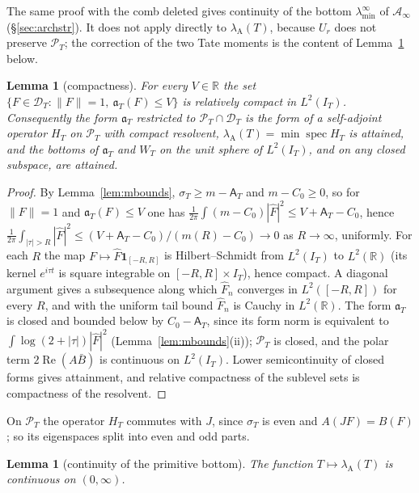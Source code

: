 \documentclass[11pt]{amsart}
\newtheorem{lemma}[theorem]{Lemma}
\theoremstyle{definition}
\theoremstyle{remark}
\newcommand{\R}{\mathbb R}
\newcommand{\Rel}{\operatorname{Re}}
\newcommand{\PT}{\mathcal P_T}
\newcommand{\IT}{I_T}
\newcommand{\lamA}{\lambda_{\mathrm A}(T)}
\newcommand{\sT}{\sigma_T}
\newcommand{\Fh}{\widehat F}
\newcommand{\Aconst}{\mathsf A_T}
\newcommand{\Ainf}{\mathcal A_\infty}
\newcommand{\laminf}{\lambda^{\infty}_{\min}}
\begin{document}
The same proof with the comb deleted gives continuity of the bottom $\laminf$ of $\Ainf$
(\S\ref{sec:archstr}). It does not apply directly to $\lamA$, because $U_r$ does not preserve $\PT$;
the correction of the two Tate moments is the content of Lemma~\ref{lem:contA} below.

\begin{lemma}[compactness]\label{lem:compact}
For every $V\in\R$ the set $\{F\in\mathcal D_T:\|F\|=1,\ \mathfrak a_T(F)\le V\}$ is relatively compact in
$L^2(\IT)$. Consequently the form $\mathfrak a_T$ restricted to $\PT\cap\mathcal D_T$ is the form of a
self-adjoint operator $H_T$ on $\PT$ with compact resolvent, $\lamA=\min\operatorname{spec}H_T$ is attained,
and the bottoms of $\mathfrak a_T$ and $W_T$ on the unit sphere of $L^2(\IT)$, and on any closed subspace, are
attained.
\end{lemma}
\begin{proof}
By Lemma~\ref{lem:mbounds}, $\sT\ge m-\Aconst$ and $m-C_0\ge0$, so for $\|F\|=1$ and
$\mathfrak a_T(F)\le V$ one has $\frac1{2\pi}\int(m-C_0)|\Fh|^2\le V+\Aconst-C_0$, hence
$\frac1{2\pi}\int_{|\tau|>R}|\Fh|^2\le(V+\Aconst-C_0)/(m(R)-C_0)\to0$ as $R\to\infty$, uniformly. For each
$R$ the map $F\mapsto\Fh\mathbf 1_{[-R,R]}$ is Hilbert--Schmidt from $L^2(\IT)$ to $L^2(\R)$ (its kernel
$e^{i\tau t}$ is square integrable on $[-R,R]\times\IT$), hence compact. A diagonal argument gives a
subsequence along which $\Fh_n$ converges in $L^2([-R,R])$ for every $R$, and with the uniform tail bound
$\Fh_n$ is Cauchy in $L^2(\R)$. The form $\mathfrak a_T$ is closed and bounded below by $C_0-\Aconst$, since its
form norm is equivalent to $\int\log(2+|\tau|)|\Fh|^2$ (Lemma~\ref{lem:mbounds}(ii)); $\PT$ is closed, and
the polar term $2\Rel(A\bar B)$ is continuous on $L^2(\IT)$. Lower semicontinuity of closed forms gives
attainment, and relative compactness of the sublevel sets is compactness of the resolvent.
\end{proof}

On $\PT$ the operator $H_T$ commutes with $J$, since $\sT$ is even and $A(JF)=B(F)$; so its eigenspaces
split into even and odd parts.

\begin{lemma}[continuity of the primitive bottom]\label{lem:contA}
The function $T\mapsto\lamA$ is continuous on $(0,\infty)$.
\end{lemma}
\end{document}
